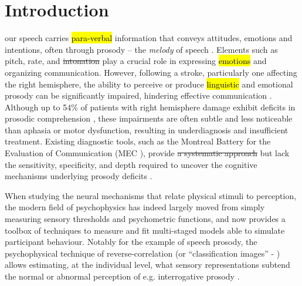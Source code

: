 \renewcommand{\chaptername}{Chapter}
\chapter{Introduction}\label{chap1}

 our speech carries \hl{para-verbal} information that conveys attitudes, emotions and intentions, often through prosody -- the  \emph{melody} of speech . Elements such as pitch, rate, and \st{intonation} play a crucial role in expressing \hl{emotions} and organizing communication. However, following a  stroke, particularly one affecting the right hemisphere, the ability to perceive or produce \hl{linguistic} and emotional prosody can be significantly impaired, hindering effective communication . Although up to 54\% of patients with right hemisphere damage exhibit deficits in prosodic comprehension , these impairments are often subtle and less noticeable than aphasia or motor dysfunction, resulting in underdiagnosis and insufficient treatment. Existing diagnostic tools, such as the Montreal Battery for the Evaluation of Communication (MEC ), provide \st{a systematic approach}  but lack the sensitivity, specificity, and depth required to uncover the cognitive mechanisms underlying prosody deficits . 


When studying the neural mechanisms that relate physical stimuli to perception, the modern field of psychophysics has indeed largely moved from simply measuring sensory thresholds and psychometric functions, and now provides a toolbox of techniques to measure and fit multi-staged models able to simulate participant behaviour. Notably for the example of speech prosody, the psychophysical technique of reverse-correlation (or “classification images” - ) allows estimating, at the individual level, what sensory representations subtend the normal or abnormal perception of e.g. interrogative prosody .

